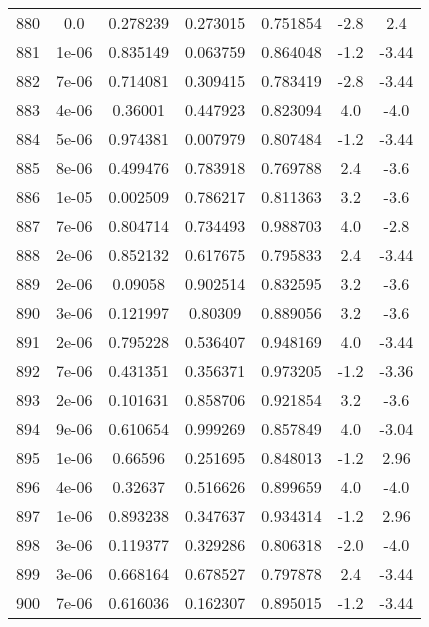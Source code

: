 \begin{table}
\begin{tabular}{c|c|c|c|c|c|c}
880 & 0.0 & 0.278239 & 0.273015 & 0.751854 & -2.8 & 2.4\\
881 & 1e-06 & 0.835149 & 0.063759 & 0.864048 & -1.2 & -3.44\\
882 & 7e-06 & 0.714081 & 0.309415 & 0.783419 & -2.8 & -3.44\\
883 & 4e-06 & 0.36001 & 0.447923 & 0.823094 & 4.0 & -4.0\\
884 & 5e-06 & 0.974381 & 0.007979 & 0.807484 & -1.2 & -3.44\\
885 & 8e-06 & 0.499476 & 0.783918 & 0.769788 & 2.4 & -3.6\\
886 & 1e-05 & 0.002509 & 0.786217 & 0.811363 & 3.2 & -3.6\\
887 & 7e-06 & 0.804714 & 0.734493 & 0.988703 & 4.0 & -2.8\\
888 & 2e-06 & 0.852132 & 0.617675 & 0.795833 & 2.4 & -3.44\\
889 & 2e-06 & 0.09058 & 0.902514 & 0.832595 & 3.2 & -3.6\\
890 & 3e-06 & 0.121997 & 0.80309 & 0.889056 & 3.2 & -3.6\\
891 & 2e-06 & 0.795228 & 0.536407 & 0.948169 & 4.0 & -3.44\\
892 & 7e-06 & 0.431351 & 0.356371 & 0.973205 & -1.2 & -3.36\\
893 & 2e-06 & 0.101631 & 0.858706 & 0.921854 & 3.2 & -3.6\\
894 & 9e-06 & 0.610654 & 0.999269 & 0.857849 & 4.0 & -3.04\\
895 & 1e-06 & 0.66596 & 0.251695 & 0.848013 & -1.2 & 2.96\\
896 & 4e-06 & 0.32637 & 0.516626 & 0.899659 & 4.0 & -4.0\\
897 & 1e-06 & 0.893238 & 0.347637 & 0.934314 & -1.2 & 2.96\\
898 & 3e-06 & 0.119377 & 0.329286 & 0.806318 & -2.0 & -4.0\\
899 & 3e-06 & 0.668164 & 0.678527 & 0.797878 & 2.4 & -3.44\\
900 & 7e-06 & 0.616036 & 0.162307 & 0.895015 & -1.2 & -3.44\\
\end{tabular}
\end{table}
\newpage
